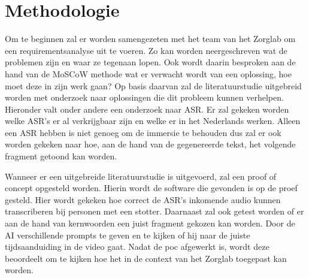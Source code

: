 

\section{Methodologie}%
\label{sec:methodologie}

Om te beginnen zal er worden samengezeten met het team van het Zorglab om een requirementsanalyse uit te voeren. Zo kan worden neergeschreven wat de problemen zijn en waar ze tegenaan lopen. Ook wordt daarin besproken aan de hand van de MoSCoW methode wat er verwacht wordt van een oplossing, hoe moet deze in zijn werk gaan? Op basis daarvan zal de literatuurstudie uitgebreid worden met onderzoek naar oplossingen die dit probleem kunnen verhelpen. Hieronder valt onder andere een onderzoek naar ASR. Er zal gekeken worden welke ASR's er al verkrijgbaar zijn en welke er in het Nederlands werken. Alleen een ASR hebben is niet genoeg om de immersie te behouden dus zal er ook worden gekeken naar hoe, aan de hand van de gegenereerde tekst, het volgende fragment getoond kan worden.

Wanneer er een uitgebreide literatuurstudie is uitgevoerd, zal een proof of concept opgesteld worden. Hierin wordt de software die gevonden is op de proef gesteld. Hier wordt gekeken hoe correct de ASR's inkomende audio kunnen transcriberen bij personen met een stotter. Daarnaast zal ook getest worden of er aan de hand van kernwoorden een juist fragment gekozen kan worden. Door de AI verschillende prompts te geven en te kijken of hij naar de juiste tijdsaanduiding in de video gaat. Nadat de poc afgewerkt is, wordt deze beoordeelt om te kijken hoe het in de context van het Zorglab toegepast kan worden.

